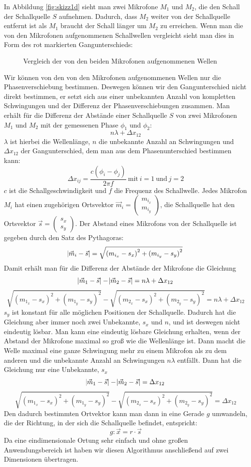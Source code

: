 In Abbildung \ref{fig:skizz1d} sieht man zwei Mikrofone $M_1$ und $M_2$, die den Schall der Schallquelle $S$ aufnehmen. Dadurch, dass $M_2$ weiter von der Schallquelle entfernt ist als $M_1$ braucht der Schall länger um $M_2$ zu erreichen. Wenn man die von den Mikrofonen aufgenommenen Schallwellen vergleicht sieht man dies in Form des rot markierten Gangunterschieds:
\begin{figure}[H]

\caption{Vergleich der von den beiden Mikrofonen aufgenommenen Wellen}
\label{fig:welle1d}
\end{figure}
Wir können von den von den Mikrofonen aufgenommenen Wellen nur die Phasenverschiebung bestimmen. Deswegen können wir den Gangunterschied nicht direkt bestimmen, er setzt sich aus einer unbekannten Anzahl von kompletten Schwingungen und der Differenz der Phasenverschiebungen zusammen. Man erhält für die Differenz der Abstände einer Schallquelle $S$ von zwei Mikrofonen $M_1$ und $M_2$ mit der gemessenen Phase $\phi_1$ und $\phi_2$: $$n\lambda + \Delta{x_{12}}$$ $\lambda$ ist hierbei die Wellenlänge, $n$ die unbekannte Anzahl an Schwingungen und $\Delta{x_{12}}$ der Gangunterschied, dem man aus dem Phasenunterschied bestimmen kann:
$$\Delta{x_{ij}} = \frac{c(\phi_i - \phi_j)}{{2\pi}f}\:\textrm{mit}\:i = 1\:\textrm{und}\:j = 2$$
$c$ ist die Schallgeschwindigkeit und $f$ die Frequenz des Schallwelle.
Jedes Mikrofon $M_i$ hat einen zugehörigen Ortsvektor $\vec{m}_i = \begin{pmatrix} m_{i_x} \\ m_{i_y}  \end{pmatrix}$, die Schallquelle hat den Ortsvektor $\vec{s} = \begin{pmatrix} {s_x} \\ {s_y}  \end{pmatrix}$. Der Abstand eines Mikrofons von der Schallquelle ist gegeben durch den Satz des Pythagoras:
$$\abs{\vec{m}_i - \vec{s}} = \sqrt{{(m_{i_x} - s_x)}^2 + {(m_{i_y} - s_y)}^2}$$
Damit erhält man für die Differenz der Abstände der Mikrofone die Gleichung
$$\abs{\vec{m}_1 - \vec{s}} - \abs{\vec{m}_2 - \vec{s}} = n\lambda + \Delta{x_{12}}$$
$$\sqrt{{(m_{1_x} - s_x)}^2 + {(m_{1_y} - s_y)}^2} - \sqrt{{(m_{2_x} - s_x)}^2 + {(m_{2_y} - s_y)}^2} = n\lambda + \Delta{x_{12}}$$$s_y$ ist konstant für alle möglichen Positionen der Schallquelle. Dadurch hat die Gleichung aber immer noch zwei Unbekannte, $s_x$ und $n$, und ist deswegen nicht eindeutig lösbar. Man kann eine eindeutig lösbare Gleichung erhalten, wenn der Abstand der Mikrofone maximal so groß wie die Wellenlänge ist. Dann macht die Welle maximal eine ganze Schwingung mehr zu einem Mikrofon als zu dem anderen und die unbekannte Anzahl an Schwingungen $n\lambda$ entfällt. Dann hat die Gleichung nur eine Unbekannte, $s_x$
$$\abs{\vec{m}_1 - \vec{s}} - \abs{\vec{m}_2 - \vec{s}} = \Delta{x_{12}}$$
$$\sqrt{{(m_{1_x} - s_x)}^2 + {(m_{1_y} - s_y)}^2} - \sqrt{{(m_{2_x} - s_x)}^2 + {(m_{2_y} - s_y)}^2} = \Delta{x_{12}}$$
Den dadurch bestimmten Ortvektor kann man dann in eine Gerade $g$ umwandeln, die der Richtung, in der sich die Schallquelle befindet, entspricht:
$$g: \vec{x} = r \cdot \vec{s}$$
Da eine eindimensionale Ortung sehr einfach und ohne großen Anwendungsbereich ist haben wir diesen Algorithmus anschließend auf zwei Dimensionen übertragen.
